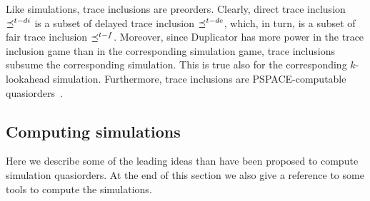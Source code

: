 Like simulations, trace inclusions are preorders.
Clearly, direct trace inclusion $\preceq^{t-di}$ is
a subset of delayed trace inclusion $\preceq^{t-de}$, which, in turn, is a subset of fair trace inclusion
$\preceq^{t-f}$.
Moreover, since Duplicator has more power in the trace inclusion game than in the
corresponding simulation game, trace inclusions subsume the corresponding simulation.
This is true also for the corresponding $k$-lookahead simulation.
Furthermore, trace inclusions are PSPACE-computable quasiorders~\cite{etessami2002hierarchy,Clemente2018}.


\subsection{Computing simulations}

Here we describe some of the leading ideas than have been proposed to compute simulation quasiorders.
At the end of this section we also give a reference to some tools
to compute the simulations.

